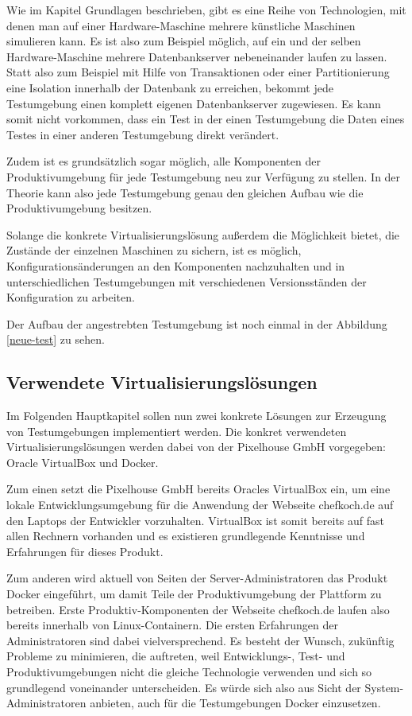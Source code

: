Wie im Kapitel Grundlagen beschrieben, gibt es eine Reihe von Technologien, mit denen man auf einer Hardware-Maschine mehrere künstliche Maschinen simulieren kann. Es ist also zum Beispiel möglich, auf ein und der selben Hardware-Maschine mehrere Datenbankserver nebeneinander laufen zu lassen. Statt also zum Beispiel mit Hilfe von Transaktionen oder einer Partitionierung eine Isolation innerhalb der Datenbank zu erreichen, bekommt jede Testumgebung einen komplett eigenen Datenbankserver zugewiesen. Es kann somit nicht vorkommen, dass ein Test in der einen Testumgebung die Daten eines Testes in einer anderen Testumgebung direkt verändert.

Zudem ist es grundsätzlich sogar möglich, alle Komponenten der Produktivumgebung für jede Testumgebung neu zur Verfügung zu stellen. In der Theorie kann also jede Testumgebung genau den gleichen Aufbau wie die Produktivumgebung besitzen.

Solange die konkrete Virtualisierungslösung außerdem die Möglichkeit bietet, die Zustände der einzelnen Maschinen zu sichern, ist es möglich, Konfigurationsänderungen an den Komponenten nachzuhalten und in unterschiedlichen Testumgebungen mit verschiedenen Versionsständen der Konfiguration zu arbeiten. 

Der Aufbau der angestrebten Testumgebung ist noch einmal in der Abbildung \ref{neue-test} zu sehen.

\subsection{Verwendete Virtualisierungslösungen}

Im Folgenden Hauptkapitel sollen nun zwei konkrete Lösungen zur Erzeugung von Testumgebungen implementiert werden. Die konkret verwendeten Virtualisierungslösungen werden dabei von der Pixelhouse GmbH vorgegeben: Oracle VirtualBox und Docker.

Zum einen setzt die Pixelhouse GmbH bereits Oracles VirtualBox ein, um eine lokale Entwicklungsumgebung für die Anwendung der Webseite chefkoch.de auf den Laptops der Entwickler vorzuhalten. VirtualBox ist somit bereits auf fast allen Rechnern vorhanden und es existieren grundlegende Kenntnisse und Erfahrungen für dieses Produkt.

Zum anderen wird aktuell von Seiten der Server-Administratoren das Produkt Docker eingeführt, um damit Teile der Produktivumgebung der Plattform zu betreiben. Erste Produktiv-Komponenten der Webseite chefkoch.de laufen also bereits innerhalb von Linux-Containern. Die ersten Erfahrungen der Administratoren sind dabei vielversprechend. Es besteht der Wunsch, zukünftig Probleme zu minimieren, die auftreten, weil Entwicklungs-, Test- und Produktivumgebungen nicht die gleiche Technologie verwenden und sich so grundlegend voneinander unterscheiden. Es würde sich also aus Sicht der System-Administratoren anbieten, auch für die Testumgebungen Docker einzusetzen.
